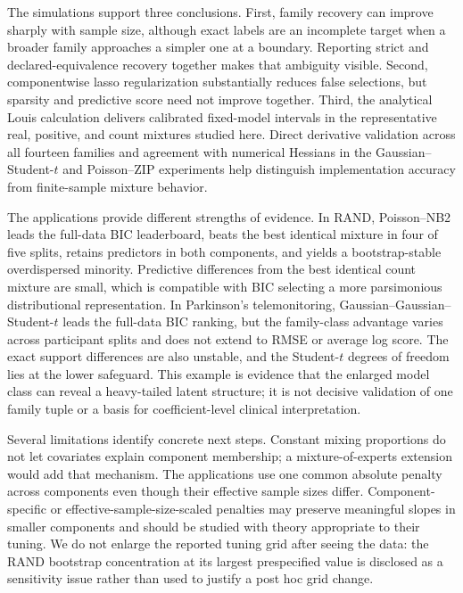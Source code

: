 \documentclass[a4paper,fleqn]{cas-sc}
\begin{document}
The simulations support three conclusions. First, family recovery can improve sharply with sample size, although exact labels are an incomplete target when a broader family approaches a simpler one at a boundary. Reporting strict and declared-equivalence recovery together makes that ambiguity visible. Second, componentwise lasso regularization substantially reduces false selections, but sparsity and predictive score need not improve together. Third, the analytical Louis calculation delivers calibrated fixed-model intervals in the representative real, positive, and count mixtures studied here. Direct derivative validation across all fourteen families and agreement with numerical Hessians in the Gaussian--Student-$t$ and Poisson--ZIP experiments help distinguish implementation accuracy from finite-sample mixture behavior.

The applications provide different strengths of evidence. In RAND, Poisson--NB2 leads the full-data BIC leaderboard, beats the best identical mixture in four of five splits, retains predictors in both components, and yields a bootstrap-stable overdispersed minority. Predictive differences from the best identical count mixture are small, which is compatible with BIC selecting a more parsimonious distributional representation. In Parkinson's telemonitoring, Gaussian--Gaussian--Student-$t$ leads the full-data BIC ranking, but the family-class advantage varies across participant splits and does not extend to RMSE or average log score. The exact support differences are also unstable, and the Student-$t$ degrees of freedom lies at the lower safeguard. This example is evidence that the enlarged model class can reveal a heavy-tailed latent structure; it is not decisive validation of one family tuple or a basis for coefficient-level clinical interpretation.

Several limitations identify concrete next steps. Constant mixing proportions do not let covariates explain component membership; a mixture-of-experts extension would add that mechanism. The applications use one common absolute penalty across components even though their effective sample sizes differ. Component-specific or effective-sample-size-scaled penalties may preserve meaningful slopes in smaller components and should be studied with theory appropriate to their tuning. We do not enlarge the reported tuning grid after seeing the data: the RAND bootstrap concentration at its largest prespecified value is disclosed as a sensitivity issue rather than used to justify a post hoc grid change.
\end{document}

